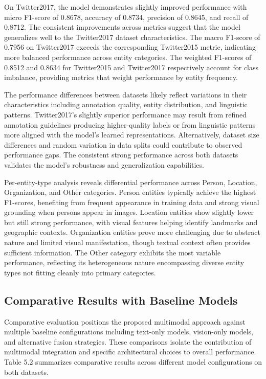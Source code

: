 \documentclass[12pt,a4paper]{report}
\begin{document}
On Twitter2017, the model demonstrates slightly improved performance with micro F1-score of 0.8678, accuracy of 0.8734, precision of 0.8645, and recall of 0.8712. The consistent improvements across metrics suggest that the model generalizes well to the Twitter2017 dataset characteristics. The macro F1-score of 0.7956 on Twitter2017 exceeds the corresponding Twitter2015 metric, indicating more balanced performance across entity categories. The weighted F1-scores of 0.8512 and 0.8634 for Twitter2015 and Twitter2017 respectively account for class imbalance, providing metrics that weight performance by entity frequency.

The performance differences between datasets likely reflect variations in their characteristics including annotation quality, entity distribution, and linguistic patterns. Twitter2017's slightly superior performance may result from refined annotation guidelines producing higher-quality labels or from linguistic patterns more aligned with the model's learned representations. Alternatively, dataset size differences and random variation in data splits could contribute to observed performance gaps. The consistent strong performance across both datasets validates the model's robustness and generalization capabilities.

Per-entity-type analysis reveals differential performance across Person, Location, Organization, and Other categories. Person entities typically achieve the highest F1-scores, benefiting from frequent appearance in training data and strong visual grounding when persons appear in images. Location entities show slightly lower but still strong performance, with visual features helping identify landmarks and geographic contexts. Organization entities prove more challenging due to abstract nature and limited visual manifestation, though textual context often provides sufficient information. The Other category exhibits the most variable performance, reflecting its heterogeneous nature encompassing diverse entity types not fitting cleanly into primary categories.

\subsection{Comparative Results with Baseline Models}

Comparative evaluation positions the proposed multimodal approach against multiple baseline configurations including text-only models, vision-only models, and alternative fusion strategies. These comparisons isolate the contribution of multimodal integration and specific architectural choices to overall performance. Table 5.2 summarizes comparative results across different model configurations on both datasets.
\end{document}
